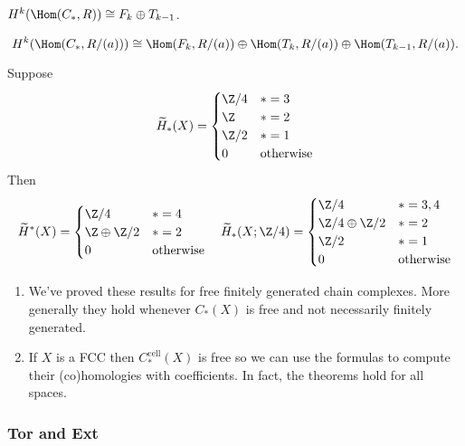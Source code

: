 \documentclass[a4paper]{article}
\newcommand{\cell}{\mathrm{cell}}
\begin{document}
\begin{proposition}
  \(H^k(\Hom(C_*, R)) \cong F_k \oplus T_{k - 1}\).
\end{proposition}

\begin{proposition}
  \[
    H^k(\Hom(C_*, R/(a))) \cong \Hom(F_k, R/(a)) \oplus \Hom(T_k, R/(a)) \oplus \Hom(T_{k - 1}, R/(a)).
  \]
\end{proposition}

\begin{eg}
  Suppose
  \[
    \widetilde H_*(X) =
    \begin{cases}
      \Z/4 & * = 3 \\
      \Z & * = 2 \\
      \Z/2 & * = 1 \\
      0 & \text{otherwise}
    \end{cases}
  \]
  Then
  \[
    \widetilde H^*(X) =
    \begin{cases}
      \Z/4 & * = 4 \\
      \Z \oplus \Z/2 & * = 2 \\
      0 & \text{otherwise}
    \end{cases}
    \quad
    \widetilde H_*(X; \Z/4) =
    \begin{cases}
      \Z/4 & * = 3, 4 \\
      \Z/4 \oplus \Z/2 & * = 2 \\
      \Z/2 & * = 1 \\
      0 & \text{otherwise}
    \end{cases}
  \]
\end{eg}

\begin{remark}\leavevmode
  \begin{enumerate}
  \item We've proved these results for free finitely generated chain complexes. More generally they hold whenever \(C_*(X)\) is free and not necessarily finitely generated.
  \item If \(X\) is a FCC then \(C_*^\cell(X)\) is free so we can use the formulas to compute their (co)homologies with coefficients. In fact, the theorems hold for all spaces.
  \end{enumerate}
\end{remark}

\subsubsection{Tor and Ext}
\end{document}
